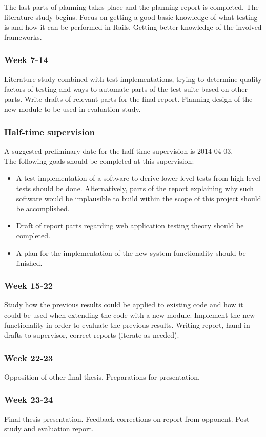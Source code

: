 The last parts of planning takes place and the planning report is
completed. The literature study begins. Focus on getting a good basic
knowledge of what testing is and how it can be performed in Rails.
Getting better knowledge of the involved frameworks.


\subsubsection{Week 7-14}

Literature study combined with test implementations, trying to determine
quality factors of testing and ways to automate parts of the test suite
based on other parts. Write drafts of relevant parts for the final
report. Planning design of the new module to be used in evaluation
study.


\subsubsection{Half-time supervision}

A suggested preliminary date for the half-time supervision is 2014-04-03.\\

The following goals should be completed at this supervision:
\begin{itemize}
    \item A test implementation of a software to derive lower-level tests
          from high-level tests should be done. Alternatively, parts of the
          report explaining why such software would be implausible to build
          within the scope of this project should be accomplished.
    \item Draft of report parts regarding web application testing theory
          should be completed.
    \item A plan for the implementation of the new system functionality
          should be finished.
\end{itemize}


\subsubsection{Week 15-22}

Study how the previous results could be applied to existing code and how
it could be used when extending the code with a new module. Implement
the new functionality in order to evaluate the previous results. Writing
report, hand in drafts to supervisor, correct reports (iterate as
needed).


\subsubsection{Week 22-23}

Opposition of other final thesis. Preparations for presentation.


\subsubsection{Week 23-24}

Final thesis presentation. Feedback corrections on report from opponent.
Post-study and evaluation report.
